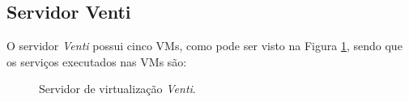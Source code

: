 \subsection{Servidor Venti}
\label{section:serv_venti}

O servidor \textit{Venti} possui cinco \ac{VM}s, como pode ser visto na Figura \ref{fig:servidor_venti}, sendo que os serviços executados nas 
\ac{VM}s são:

\begin{figure}[h!]
 \centering
 \caption{Servidor de virtualização \textit{Venti}.}
 \label{fig:servidor_venti}
\end{figure}

